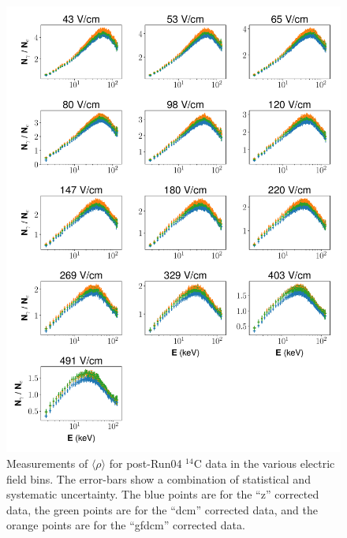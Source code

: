 \begin{figure}[!h]
\centering
  \includegraphics[width=\textwidth]{Figures/C14_rho_final.pdf}
\caption{Measurements of $\langle \rho \rangle$ for post-Run04 $^{14}$C data in the various electric field bins. The error-bars show a combination of statistical and systematic uncertainty. The blue points are for the ``z'' corrected data, the green points are for the ``dcm'' corrected data, and the orange points are for the ``gfdcm'' corrected data.}
\label{fig:C14_rho_final}
\end{figure}
